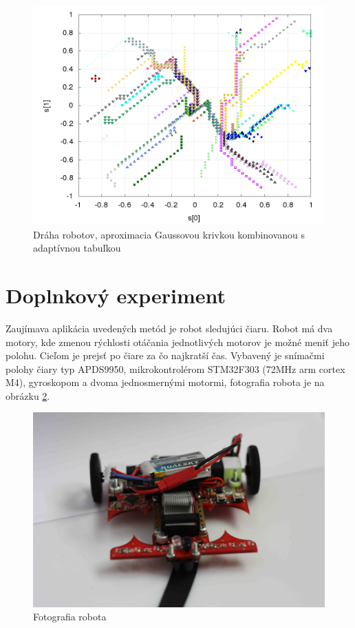   \begin{figure}[!htb]
  \centering
  \includegraphics[scale=.4]{../../results_q_learning/map_2/function_type_6/iterations_10/agents_path_surface.png}
  \caption{Dráha robotov, aproximacia  Gaussovou krivkou kombinovanou s adaptívnou tabuľkou}
  \label{img:experiment_gauss_adaptive_table_path}
  \end{figure}



\newpage
\section {Doplnkový experiment}

Zaujímava aplikácia uvedených metód je robot sledujúci čiaru. Robot má dva motory, kde zmenou
rýchlosti otáčania jednotlivých motorov je možné meniť jeho polohu. Cieľom je prejsť
po čiare za čo najkratší čas.
Vybavený je snímačmi polohy čiary typ APDS9950, mikrokontrolérom STM32F303 (72MHz arm cortex M4),
gyroskopom a dvoma jednosmernými motormi, fotografia robota je na obrázku \ref{img:motoko_photo}.

\begin{figure}[!htb]
\center
\includegraphics[scale=.08]{../pictures/motoko_aftermath_front.jpg}
\caption{Fotografia robota}
\label{img:motoko_photo}
\end{figure}

